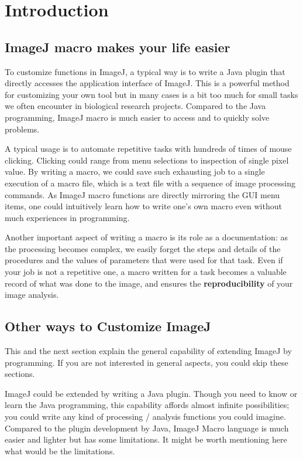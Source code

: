 \section{Introduction}

\subsection{ImageJ macro makes your life easier}

To customize functions in ImageJ, a typical way is to write a Java plugin that directly accesses the application interface of ImageJ. 
This is a powerful method for customizing your own tool but in many cases is a bit too much for small tasks we often encounter in biological research projects. Compared to the Java programming, ImageJ macro is much easier to access and to quickly solve problems.

A typical usage is to automate repetitive tasks with hundreds of times of mouse clicking. Clicking could range from menu selections to inspection of single pixel value. By writing a macro, we could save such exhausting job to a single execution of a macro file, which is a text file with a sequence of image processing commands. As ImageJ macro functions are directly mirroring the GUI menu items, one could intuitively learn how to write one's own macro even without much experiences in programming.

Another important aspect of writing a macro is its role as a documentation: as the processing becomes complex, we easily forget the steps and details of the procedures and the values of parameters that were used for that task. Even if your job is not a repetitive one, a macro written for a task becomes a valuable record of what was done to the image, and ensures the \textbf{reproducibility} of your image analysis.

\subsection{Other ways to Customize ImageJ}

This and the next section explain the general capability of extending ImageJ by programming. If you are not interested in general aspects, you could skip these sections.

ImageJ could be extended by writing a Java plugin. Though you need to know or learn the Java programming,  this capability affords almost infinite possibilities;  you could write any kind of processing / analysis functions you could imagine. Compared to the plugin development by Java, ImageJ Macro language is much easier and lighter but has some limitations. It might be worth mentioning here what would be the limitations.

